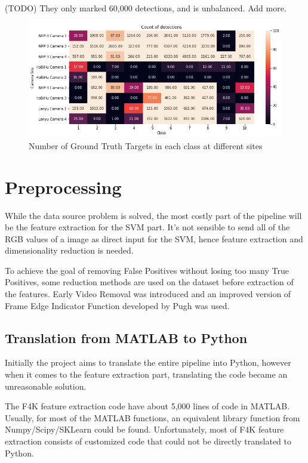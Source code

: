 \documentclass[bsc,logo,twoside,fullspacing,parskip]{infthesis}
\begin{document}
(TODO) They only marked 60,000 detections, and is unbalanced. Add more.

\begin{figure}[h]
    \centering
    \includegraphics[scale=0.52]{graph/idscount.png}
    \caption{Number of Ground Truth Targets in each class at different sites}
    \label{fig:gtdist}
\end{figure}


\chapter{Preprocessing}
\label{sec:prepro}

While the data source problem is solved, the most costly part of the pipeline will be the feature extraction for the SVM part. 
It's not sensible to send all of the RGB values of a image as direct input for the SVM, hence feature extraction and dimensionality reduction is needed.

To achieve the goal of removing False Positives without losing too many True Positives, some reduction methods are used on the dataset before extraction of the features. 
Early Video Removal was introduced and an improved version of Frame Edge Indicator Function developed by Pugh was used.

\section{Translation from MATLAB to Python}
\label{sec:translate}

Initially the project aims to translate the entire pipeline into Python, however when it comes to the feature extraction part, translating the code became an unreasonable solution.

The F4K feature extraction code have about 5,000 lines of code in MATLAB.
Usually, for most of the MATLAB functions, an equivalent library function from Numpy/Scipy/SKLearn could be found.
Unfortunately, most of F4K feature extraction consists of customized code that could not be directly translated to Python.
\end{document}
